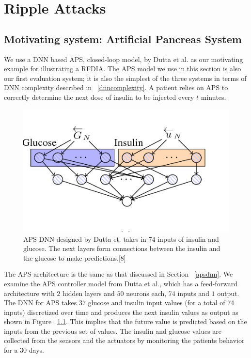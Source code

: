 \chapter{Ripple Attacks}
\label{attack}

\section{Motivating system: Artificial Pancreas System}
\label{aps}

We use a DNN based \ac{APS}, closed-loop model, by Dutta et al. \cite{10.1007/978-3-319-99429-1_11}  as our motivating example for illustrating a \ac{RFDIA}. 
The \ac{APS} model we use in this section is also our first evaluation system; it is also the simplest of the three systems in terms of \ac{DNN} complexity described in ~\ref{dnncomplexity}.
A patient relies on  \ac{APS} to correctly determine the next dose of insulin to be injected every $t$ minutes. 

\begin{figure}
	\centering
	\includegraphics[width=0.7\linewidth, height=0.3\linewidth]{Images/APSDNN}
	\caption[APS DNN]{APS DNN designed by Dutta et. takes in 74 inputs of insulin and glucose. The next layers form connections between the insulin and the glucose to make predictions.[8]}
	\label{fig:apsdnn}
\end{figure}

The APS architecture is  the same as that discussed in Section ~\ref{apsdnn}. 
We examine the \ac{APS} controller model from Dutta et al., which has a feed-forward architecture with $2$ hidden layers and $50$ neurons each, 74 inputs and $1$ output. 
The DNN for APS takes $37$ glucose and insulin input values (for a total of 74 inputs) discretized over time and produces the next insulin values as output as shown in Figure ~\ref{fig:apsdnn}. 
 This implies that the future value is predicted based on the inputs from the previous set of values. 
The insulin and glucose values are collected from the sensors and the actuators by monitoring the patients behavior for a $30$ days. 



